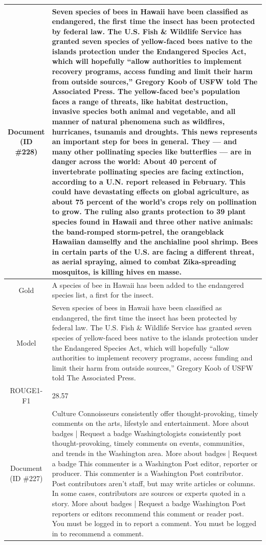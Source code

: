 \begin{table}[bth!]
\begin{tabular}{c|p{}}
\makecell{Document\\(ID \#228)} & 
Seven species of bees in Hawaii have been classified as endangered, the first time the insect has been protected by federal law. The U.S. Fish \& Wildlife Service has granted seven species of yellow-faced bees native to the islands protection under the Endangered Species Act, which will hopefully “allow authorities to implement recovery programs, access funding and limit their harm from outside sources,” Gregory Koob of USFW told The Associated Press. The yellow-faced bee’s population faces a range of threats, like habitat destruction, invasive species both animal and vegetable, and all manner of natural phenomena such as wildfires, hurricanes, tsunamis and droughts. This news represents an important step for bees in general. They — and many other pollinating species like butterflies — are in danger across the world: About 40 percent of invertebrate pollinating species are facing extinction, according to a U.N. report released in February. This could have devastating effects on global agriculture, as about 75 percent of the world’s crops rely on pollination to grow. The ruling also grants protection to 39 plant species found in Hawaii and three other native animals: the band-romped storm-petrel, the orangeblack Hawaiian damselfly and the anchialine pool shrimp. Bees in certain parts of the U.S. are facing a different threat, as aerial spraying, aimed to combat Zika-spreading mosquitos, is killing hives en masse.
\\ \hline
Gold & 
A species of bee in Hawaii has been added to the endangered species list, a first for the insect.
\\ \hline
Model & 
Seven species of bees in Hawaii have been classified as endangered, the first time the insect has been protected by federal law. The U.S. Fish \& Wildlife Service has granted seven species of yellow-faced bees native to the islands protection under the Endangered Species Act, which will hopefully “allow authorities to implement recovery programs, access funding and limit their harm from outside sources,” Gregory Koob of USFW told The Associated Press.
\\ \hline
ROUGE1-F1 & 
28.57
\\ \hline
\makecell{Document\\(ID \#227)} & 
Culture Connoisseurs consistently offer thought-provoking, timely comments on the arts, lifestyle and entertainment. More about badges | Request a badge Washingtologists consistently post thought-provoking, timely comments on events, communities, and trends in the Washington area. More about badges | Request a badge This commenter is a Washington Post editor, reporter or producer. This commenter is a Washington Post contributor. Post contributors aren’t staff, but may write articles or columns. In some cases, contributors are sources or experts quoted in a story. More about badges | Request a badge Washington Post reporters or editors recommend this comment or reader post. You must be logged in to report a comment. You must be logged in to recommend a comment.

\end{tabular}
\end{table}

